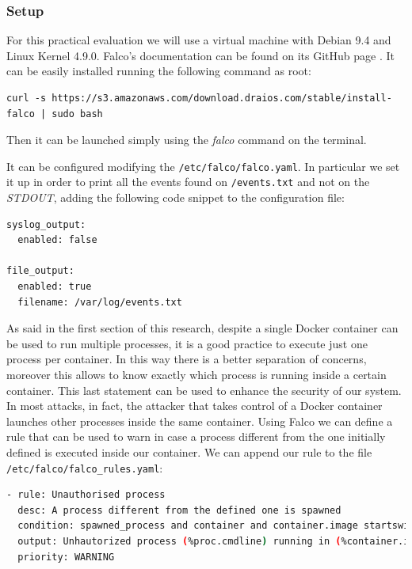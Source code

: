 \documentclass[a4paper,12pt]{article}
\newcommand{\file}[1]{\texttt{#1}\xspace}
\begin{document}
\subsubsection{Setup}

For this practical evaluation we will use a virtual machine with Debian 9.4 and
Linux Kernel 4.9.0. Falco's documentation can be found on its GitHub page
\cite{falco_doc}. It can be easily installed running the following command as
root:
\begin{lstlisting}
curl -s https://s3.amazonaws.com/download.draios.com/stable/install-falco | sudo bash
\end{lstlisting}
Then it can be launched simply using the \textit{falco} command on the
terminal. \par It can be configured modifying the
\file{/etc/falco/falco.yaml}. In particular we set it up in order to print all
the events found on \file{/events.txt} and not on the \textit{STDOUT}, adding
the following code snippet to the configuration file:
\begin{lstlisting}[language=bash,breaklines]
syslog_output:
  enabled: false

file_output:
  enabled: true
  filename: /var/log/events.txt
\end{lstlisting}
\par As said in the first section of this research, despite a single Docker
container can be used to run multiple processes, it is a good practice to
execute just one process per container. In this way there is a better separation
of concerns, moreover this allows to know exactly which process is running
inside a certain container. This last statement can be used to enhance the
security of our system. In most attacks, in fact, the attacker that takes
control of a Docker container launches other processes inside the same
container. Using Falco we can define a rule that can be used to warn in case a
process different from the one initially defined is executed inside our
container. We can append our rule to the file
\file{/etc/falco/falco\_rules.yaml}:

\begin{lstlisting}[language=bash,breaklines]
- rule: Unauthorised process
  desc: A process different from the defined one is spawned
  condition: spawned_process and container and container.image startswith nginx and not proc.name in (nginx)
  output: Unhautorized process (%proc.cmdline) running in (%container.id)
  priority: WARNING
\end{lstlisting}
\end{document}
